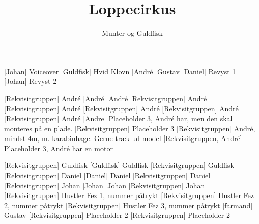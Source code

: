 \documentclass[a4paper,11pt]{article}
\title{Loppecirkus}
\author{Munter og Guldfisk}
\begin{document}
\maketitle

\begin{roles}
[Johan] Voiceover
[Guldfisk] Hvid Klovn
[André] Gustav
[Daniel] Revyst 1
[Johan] Revyst 2
\end{roles}

\begin{props}
[Rekvisitgruppen] André
[André] André
[Rekvisitgruppen] André
[Rekvisitgruppen] André
[Rekvisitgruppen] André
[Rekvisitgruppen] André
[Rekvisitgruppen] André
[Andre] Placeholder 3, André har, men den
skal monteres på en plade.
[Rekvisitgruppen] Placeholder 3
[Rekvisitgruppen] André, mindst 4m, m. karabinhage. Gerne træk-ud-model
[Rekvisitgruppen, André] Placeholder 3, André har en motor

[Rekvisitgruppen] Guldfisk
[Guldfisk] Guldfisk
[Rekvisitgruppen] Guldfisk
[Rekvisitgruppen] Daniel
[Daniel] Daniel
[Rekvisitgruppen] Daniel
[Rekvisitgruppen] Johan
[Johan] Johan
[Rekvisitgruppen] Johan
[Rekvisitgruppen] Hustler Fez 1, nummer påtrykt
[Rekvisitgruppen] Hustler Fez 2, nummer påtrykt
[Rekvisitgruppen] Hustler Fez 3, nummer påtrykt
[farmand] Gustav
[Rekvisitgruppen] Placeholder 2
[Rekvisitgruppen] Placeholder 2
\end{props}
\end{document}
